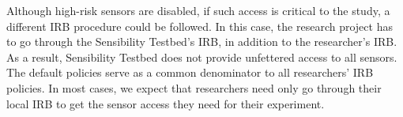 Although high-risk sensors are disabled, if such access  is critical to the 
study, a different IRB procedure could be followed. 
In this case, the research project has to go through the Sensibility 
Testbed's IRB, in addition to the researcher's IRB. 
%
%
As a result, Sensibility Testbed does not
provide unfettered access to all sensors. 
The default policies serve as a common denominator to all 
researchers' IRB policies. In most cases, we expect
that researchers need only go through their local IRB to get
the sensor access they need for their experiment. 
